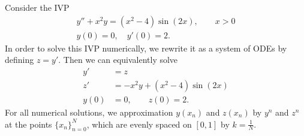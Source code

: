 \documentclass{homework}
\begin{document}
	\maketitle
	
	\question
	Consider the IVP
	\begin{gather*}
		y'' + x^2y = (x^2-4)\sin(2x), \qquad x > 0 \\
		y(0) = 0, \quad y'(0) = 2.
	\end{gather*}
	In order to solve this IVP numerically, we rewrite it as a system of ODEs by defining $z = y'$. Then we can equivalently solve
	\begin{align*}
		y' &= z \\
		z' &= -x^2y + (x^2-4)\sin(2x) \\
		y(0) &= 0, \qquad z(0) = 2.
	\end{align*}
	For all numerical solutions, we approximation $y(x_n)$ and $z(x_n)$ by $y^n$ and $z^n$ at the points $\{x_n\}_{n=0}^N$, which are evenly spaced on $[0,1]$ by $k = \frac{1}{N}$.
	
\end{document}
